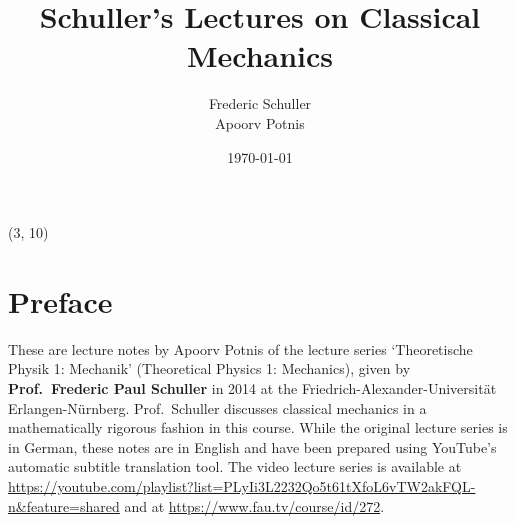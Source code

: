 \documentclass[a4 paper, 12pt]{book}
\title{Schuller's Lectures on Classical Mechanics}
\author{Frederic Schuller\\Apoorv Potnis}
\date{\today}
\theoremstyle{definition}
\begin{document}
    \begin{titlepage}
        \vspace*{0pt}
        \hypertarget{CoverPage}{}
        
        \pagecolor{springerprogressinmathphysblue} 
        \begin{textblock}{18}(3, 10)
        \end{textblock}
    \end{titlepage}
    \clearpage\restoregeometry
    \pagecolor{white}

    
    \hypertarget{TitlePage}{}
    \maketitle
    
    \frontmatter
    \chapter*{Preface}
    \hypertarget{Preface}{}
    These are lecture notes by Apoorv Potnis of the lecture series `Theoretische Physik 1: Mechanik' (Theoretical Physics 1: Mechanics), given by \textbf{Prof.\ Frederic Paul Schuller} in 2014 at the Friedrich-Alexander-Universität Erlangen-Nürnberg. Prof.\ Schuller discusses classical mechanics in a mathematically rigorous fashion in this course. While the original lecture series is in German, these notes are in English and have been prepared using YouTube's automatic subtitle translation tool. The video lecture series is available at \url{https://youtube.com/playlist?list=PLyIi3L2232Qo5t61tXfoL6vTW2akFQL-n&feature=shared} and at \url{https://www.fau.tv/course/id/272}.
\end{document}
